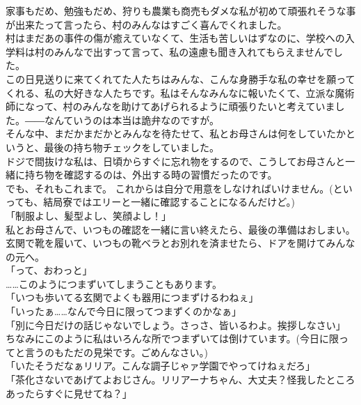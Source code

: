 \documentclass[oneside, a4paper]{jsbook}
\begin{document}
家事もだめ、勉強もだめ、狩りも農業も商売もダメな私が初めて頑張れそうな事が出来たって言ったら、村のみんなはすごく喜んでくれました。\\
村はまだあの事件の傷が癒えていなくて、生活も苦しいはずなのに、学校への入学料は村のみんなで出すって言って、私の遠慮も聞き入れてもらえませんでした。\\
この日見送りに来てくれてた人たちはみんな、こんな身勝手な私の幸せを願ってくれる、私の大好きな人たちです。私はそんなみんなに報いたくて、立派な魔術師になって、村のみんなを助けてあげられるように頑張りたいと考えていました。――なんていうのは本当は詭弁なのですが。\\

そんな中、まだかまだかとみんなを待たせて、私とお母さんは何をしていたかというと、最後の持ち物チェックをしていました。\\
ドジで間抜けな私は、日頃からすぐに忘れ物をするので、こうしてお母さんと一緒に持ち物を確認するのは、外出する時の習慣だったのです。\\
でも、それもこれまで。
これからは自分で用意をしなければいけません。(といっても、結局寮ではエリーと一緒に確認することになるんだけど。)\\

「制服よし、髪型よし、笑顔よし！」\\
私とお母さんで、いつもの確認を一緒に言い終えたら、最後の準備はおしまい。\\
玄関で靴を履いて、いつもの靴ベラとお別れを済ませたら、ドアを開けてみんなの元へ。\\

\noindent
「って、おわっと」\\

……このようにつまずいてしまうこともあります。\\

\noindent
「いつも歩いてる玄関でよくも器用につまずけるわねぇ」\\
「いったぁ……なんで今日に限ってつまずくのかなぁ」\\
「別に今日だけの話じゃないでしょう。さっさ、皆いるわよ。挨拶しなさい」\\

ちなみにこのように私はいろんな所でつまずいては倒けています。(今日に限ってと言うのもただの見栄です。ごめんなさい。)\\

\noindent
「いたそうだなぁリリア。こんな調子じゃァ学園でやってけねぇだろ」\\
「茶化さないであげてよおじさん。リリアーナちゃん、大丈夫？怪我したところあったらすぐに見せてね？」\\
\end{document}

